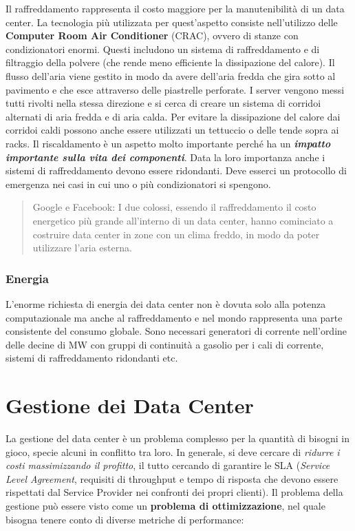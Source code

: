 \documentclass{article}
\begin{document}
		Il raffreddamento rappresenta il costo maggiore
		per la manutenibilità di un data center. La tecnologia più utilizzata
		per quest'aspetto consiste nell'utilizzo delle \textbf{Computer
		Room Air Conditioner} (CRAC), ovvero di stanze con
		condizionatori enormi. Questi includono un sistema di
		raffreddamento e di filtraggio della polvere (che
		rende meno efficiente la dissipazione del calore). Il
		flusso dell'aria viene gestito in modo da avere
		dell'aria fredda che gira sotto al pavimento e che esce
		attraverso delle piastrelle perforate. I server vengono
		messi tutti rivolti nella stessa direzione e si cerca di creare un
		sistema di corridoi alternati di aria fredda e di aria
		calda. Per evitare la dissipazione del calore dai corridoi caldi
		possono anche essere utilizzati un tettuccio o delle
		tende sopra ai racks. Il riscaldamento è
		un aspetto molto importante perché ha un \textbf{\emph{impatto
		importante sulla vita dei componenti}}. Data la loro importanza anche i
		sistemi di raffreddamento devono essere ridondanti. Deve
		esserci un protocollo di emergenza nei casi in cui uno o
		più condizionatori si spengono.
		
		\begin{quote}
		Google e Facebook: I due colossi,
		essendo il raffreddamento il costo energetico più grande all'interno di
		un data center, hanno cominciato a costruire data center in
		zone con un clima freddo, in modo da poter
		utilizzare l'aria esterna.
		\end{quote}
		
		\subsubsection{Energia}
		L'enorme richiesta di energia dei data center non è dovuta solo alla potenza computazionale ma anche al raffreddamento e nel mondo rappresenta una parte consistente del consumo globale. Sono necessari generatori di corrente nell'ordine delle decine di MW con gruppi di continuità a gasolio per i cali di corrente, sistemi di raffreddamento ridondanti etc.
		
		\newpage
		\section{Gestione dei Data Center}
		La gestione del data center è un problema complesso per la
		quantità di bisogni in gioco, specie alcuni in conflitto tra loro. In
		generale, si deve cercare di \emph{ridurre i costi massimizzando il
		profitto}, il tutto cercando di garantire le SLA (\emph{Service
		Level Agreement}, requisiti di throughput e tempo di risposta che devono essere rispettati dal
		Service Provider nei confronti dei propri clienti). Il problema
		della gestione può essere visto come un \textbf{problema di
		ottimizzazione}, nel quale bisogna tenere conto di diverse
		metriche di performance:
		
\end{document}
